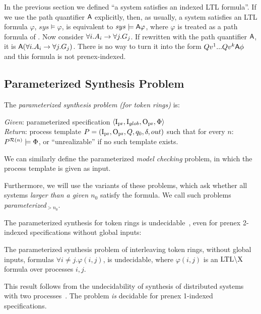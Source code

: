 \begin{remark}\label{tok_rings:rem:gr1-not-prenex}
In the previous section we defined ``a system satisfies an indexed LTL formula''.
If we use the path quantifier ${\operatorname{\mathsf{A}}}$ explicitly,
then, as usually, a system satisfies an LTL formula $\varphi$,
$sys\models \varphi$, is equivalent to $sys \models {\ensuremath{\operatorname{\mathsf{A}}}}\varphi$,
where $\varphi$ is treated as a path formula of \CTLstar.
Now consider $\forall i.A_i \rightarrow \forall j.G_j$.
If rewritten with the path quantifier ${\operatorname{\mathsf{A}}}$, it is ${\operatorname{\mathsf{A}}}(\forall i.A_i \rightarrow \forall j.G_j)$.
There is no way to turn it into the form $Q {v^1}... Q {v^k} {\operatorname{\mathsf{A}}} \phi$
and this formula is not prenex-indexed.
\end{remark}


\subsection{Parameterized Synthesis Problem}
The \emph{parameterized synthesis problem (for token rings)} is:

\smallskip\noindent
\emph{Given}: parameterized specification $\left<{\mathrm{I}_{\mathrm{pr}}},\mathrm{I}_{glob},{\mathrm{O}_{\mathrm{pr}}},\Phi\right>$ \\
\emph{Return}: process template $P=({\mathrm{I}_{\mathrm{pr}}},{\mathrm{O}_{\mathrm{pr}}},Q,q_0,\delta,out)$ such that
          for every $n$: $P^{\mathcal {R}(n)} \models \Phi$,
          or ``unrealizable'' if no such template exists.
\smallskip

We can similarly define the parameterized \emph{model checking} problem,
in which the process template is given as input.

Furthermore, we will use the variants of these problems,
which ask whether all systems \emph{larger than a given $n_0$}
satisfy the formula.
We call such problems {\em parameterized$_{>n_0}$}.

The parameterized synthesis for token rings is undecidable~\cite{JB14},
even for prenex 2-indexed specifications without global inputs:
\begin{theorem}\label{tok_rings:thm:param-synth-is-undec}
The parameterized synthesis problem of interleaving token rings,
without global inputs,
formulas $\forall i \neq j. \varphi(i,j)$,
is undecidable,
where $\varphi(i,j)$ is an $\text{LTL}\backslash\text{X}$ formula over processes $i,j$.
\end{theorem}
\noindent This result follows from the undecidability of synthesis of
distributed systems with two processes~\cite{DBLP:conf/focs/PnueliR90}.
The problem \emph{is} decidable for prenex 1-indexed specifications.


